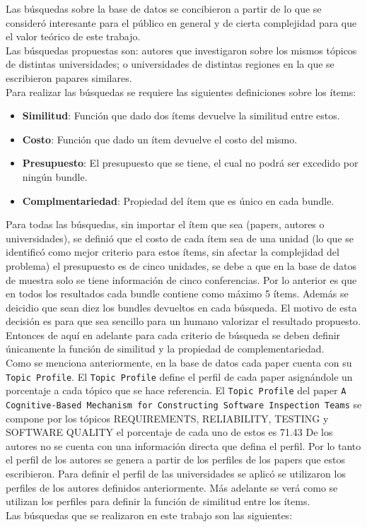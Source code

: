 Las búsquedas sobre la base de datos se concibieron a partir de lo que se consideró interesante para el público en general y de cierta complejidad para que el valor teórico de este trabajo.\\
Las búsquedas propuestas son: autores que investigaron sobre los mismos tópicos de distintas universidades; o universidades de distintas regiones en la que se escribieron papares similares.\\
Para realizar las búsquedas se requiere las siguientes definiciones sobre los ítems:
\begin{itemize}
  \item \textbf{Similitud}: Función que dado dos ítems devuelve la similitud entre estos.
  \item \textbf{Costo}: Función que dado un ítem devuelve el costo del mismo.
  \item \textbf{Presupuesto}: El presupuesto que se tiene, el cual no podrá ser excedido por ningún bundle.
  \item \textbf{Complmentariedad}: Propiedad del ítem que es único en cada bundle.
\end{itemize}
Para todas las búsquedas, sin importar el ítem que sea (papers, autores o universidades),  se definió que el costo de cada ítem sea de una unidad (lo que se identificó como mejor criterio para estos ítems, sin afectar la complejidad del problema) el presupuesto es de cinco unidades, se debe a que en la base de datos de muestra solo se tiene información de cinco conferencias. Por lo anterior es que en todos los resultados cada bundle contiene como máximo 5 ítems. Además se deicidio que sean diez los bundles devueltos en cada búsqueda. El motivo de esta decisión es para que sea sencillo para un humano valorizar el resultado propuesto. Entonces de aquí en adelante para cada criterio de búsqueda se deben definir únicamente la función de similitud y la propiedad de complementariedad.\\
Como se menciona anteriormente, en la base de datos cada paper cuenta con su \texttt{Topic Profile}. El \texttt{Topic Profile} define el perfil de cada paper asignándole un porcentaje a cada tópico que se hace referencia. El \texttt{Topic Profile} del paper \texttt{A Cognitive-Based Mechanism for Constructing Software Inspection Teams}  se compone por los tópicos  REQUIREMENTS, RELIABILITY, TESTING y SOFTWARE QUALITY el porcentaje de cada uno de estos es 71.43 %
De los autores no se cuenta con una información directa que defina el perfil. Por lo tanto el perfil de los autores  se genera a partir de los perfiles de los papers que estos escribieron. Para definir el perfil de las universidades se aplicó  se utilizaron los perfiles de los autores definidos anteriormente. Más adelante se verá como se utilizan los perfiles para definir la función de similitud entre los ítems.\\
Las búsquedas que se realizaron en este trabajo son las siguientes:
